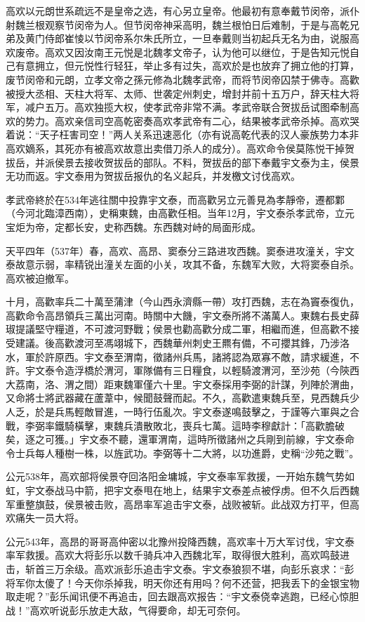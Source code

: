 高欢以元朗世系疏远不是皇帝之选，有心另立皇帝。他最初有意奉戴节闵帝，派仆射魏兰根观察节闵帝为人。但节闵帝神采高明，魏兰根怕日后难制，于是与高乾兄弟及黄门侍郎崔㥄以节闵帝系尔朱氏所立，一旦奉戴则当初起兵无名为由，说服高欢废帝。高欢又因汝南王元悦是北魏孝文帝子，认为他可以继位，于是告知元悦自己有意拥立，但元悦性行轻狂，举止多有过失，高欢於是也放弃了拥立他的打算，废节闵帝和元朗，立孝文帝之孫元修為北魏孝武帝，而将节闵帝囚禁于佛寺。高歡被授大丞相、天柱大将军、太师、世袭定州刺史，增封并前十五万户，辞天柱大将军，减户五万。高欢独揽大权，使孝武帝非常不满。孝武帝联合贺拔岳试图牵制高欢的势力。高欢亲信司空高乾密奏高欢孝武帝有二心，结果被孝武帝杀掉。高欢哭着说：“天子枉害司空！”两人关系迅速恶化（亦有说高乾代表的汉人豪族势力本非高欢嫡系，其死亦有被高欢故意出卖借刀杀人的成分）。高欢命令侯莫陈悦干掉贺拔岳，并派侯景去接收贺拔岳的部队。不料，贺拔岳的部下奉戴宇文泰为主，侯景无功而返。宇文泰用为贺拔岳报仇的名义起兵，并发檄文讨伐高欢。

孝武帝終於在534年逃往關中投靠宇文泰，而高歡另立元善見為孝靜帝，遷都鄴（今河北臨漳西南），史稱東魏，由高歡任相。当年12月，宇文泰杀孝武帝，立元宝炬为帝，定都长安，史称西魏。东西魏对峙的局面形成。

天平四年（537年）春，高欢、高昂、窦泰分三路进攻西魏。窦泰进攻潼关，宇文泰故意示弱，率精锐出潼关左面的小关，攻其不备，东魏军大败，大将窦泰自杀。高欢被迫撤军。

十月，高歡率兵二十萬至蒲津（今山西永濟縣一帶）攻打西魏，志在為竇泰復仇，高歡命令高昂領兵三萬出河南。時關中大饑，宇文泰所將不滿萬人。東魏右長史薛琡提議堅守糧道，不可渡河野戰；侯景也勸高歡分成二軍，相繼而進，但高歡不接受建議。後高歡渡河至馮翊城下，西魏華州刺史王羆有備，不可攖其鋒，乃涉洛水，軍於許原西。宇文泰至渭南，徵諸州兵馬，諸將認為眾寡不敵，請求緩進，不許。宇文泰令造浮橋於渭河，軍隊備有三日糧食，以輕騎渡渭河，至沙苑（今陝西大荔南，洛、渭之間）距東魏軍僅六十里。宇文泰採用李弼的計謀，列陣於渭曲，又命將士將武器藏在蘆葦中，候聞鼓聲而起。不久，高歡遣東魏兵至，見西魏兵少人乏，於是兵馬輕敵冒進，一時行伍亂次。宇文泰遂鳴鼓擊之，于謹等六軍與之合戰，李弼率鐵騎橫擊，東魏兵潰散敗北，喪兵七萬。這時李穆獻計：「高歡膽破矣，逐之可獲。」宇文泰不聽，還軍渭南，這時所徵諸州之兵剛到前線，宇文泰命令士兵每人種樹一株，以旌武功。李弼等十二大將，以功進爵，史稱“沙苑之戰”。

公元538年，高欢部将侯景夺回洛阳金墉城，宇文泰率军救援，一开始东魏气势如虹，宇文泰战马中箭，把宇文泰甩在地上，结果宇文泰差点被俘虏。但不久后西魏军重整旗鼓，侯景被击败，高昂率军追击宇文泰，战败被斩。此战双方打平，但高欢痛失一员大将。

公元543年，高昂的哥哥高仲密以北豫州投降西魏，高欢率十万大军讨伐，宇文泰率军救援。高欢大将彭乐以数千骑兵冲入西魏北军，取得很大胜利，高欢鸣鼓进击，斩首三万余级。高欢派彭乐追击宇文泰。宇文泰狼狈不堪，向彭乐哀求：“彭将军你太傻了！今天你杀掉我，明天你还有用吗？何不还营，把我丢下的金银宝物取走呢？”彭乐闻讯便不再追击，回去跟高欢报告：“宇文泰侥幸逃跑，已经心惊胆战！”高欢听说彭乐放走大敌，气得要命，却无可奈何。


